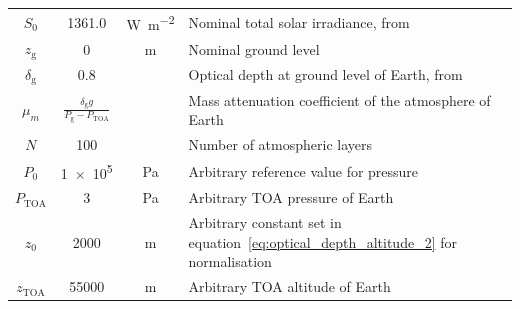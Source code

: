 \documentclass[a4paper,10pt,twocolumn,\classoptions]{article}
\newcommand{\zTOA}{z_\text{TOA}}
\newcommand{\PTOA}{P_\text{TOA}}
\begin{document}
\begin{table}[h]
\begin{tabular}[b]{cccp{}}
    $S_0$              & \num{1361.0}           & \unit{\watt\per\square\metre}         & Nominal total solar irradiance, from \cite{IAU}                    \\
    $z_\text{g}$       & \num{0}                & \unit{\metre}                         & Nominal ground level                                               \\
    \midrule
    $\delta_\text{g}$            & \num{0.8}            &                         & Optical depth at ground level of Earth, from \cite[56]{Catling}                                             \\
    $\mu_m$            & $\frac{\delta_\text{g} g}{P_\text{g} - \PTOA}$            &                         & Mass attenuation coefficient of the atmosphere of Earth                                           \\
    $N$            & \num{100}            &                         & Number of atmospheric layers                                             \\
    $P_0$       & \num{1e5}       & \unit{\pascal}                        & Arbitrary reference value for pressure           \\
    $\PTOA$            & \num{3}            & \unit{\pascal}                         & Arbitrary TOA pressure of Earth                                            \\ 
    $z_0$            & \num{2000}            & \unit{\metre}                        & Arbitrary constant set in equation~\ref{eq:optical_depth_altitude_2} for normalisation                                            \\
    $\zTOA$            & \num{55000}            & \unit{\metre}                         & Arbitrary TOA altitude of Earth                                            \\
    \bottomrule
  \end{tabular}
\end{table}
\end{document}

